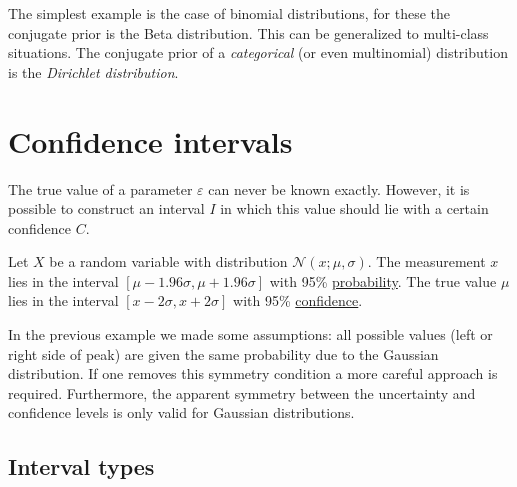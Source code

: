 {    

    \begin{example}
        The simplest example is the case of binomial distributions, for these the conjugate prior is the Beta distribution. This can be generalized to multi-class situations. The conjugate prior of a \textit{categorical} (or even multinomial) distribution is the \textit{Dirichlet distribution}.
    \end{example}

\section{Confidence intervals}

    The true value of a parameter $\varepsilon$ can never be known exactly. However, it is possible to construct an interval $I$ in which this value should lie with a certain confidence $C$.
    \begin{example}
        Let $X$ be a random variable with distribution $\mathcal{N}(x;\mu,\sigma)$. The measurement $x$ lies in the interval $[\mu - 1.96\sigma, \mu+1.96\sigma]$ with 95\% \underline{probability}. The true value $\mu$ lies in the interval $[x - 2\sigma, x+2\sigma]$ with 95\% \underline{confidence}.
    \end{example}
    \begin{remark*}
        In the previous example we made some assumptions: all possible values (left or right side of peak) are given the same probability due to the Gaussian distribution. If one removes this symmetry condition a more careful approach is required. Furthermore, the apparent symmetry between the uncertainty and confidence levels is only valid for Gaussian distributions.
    \end{remark*}

\subsection{Interval types}

}
